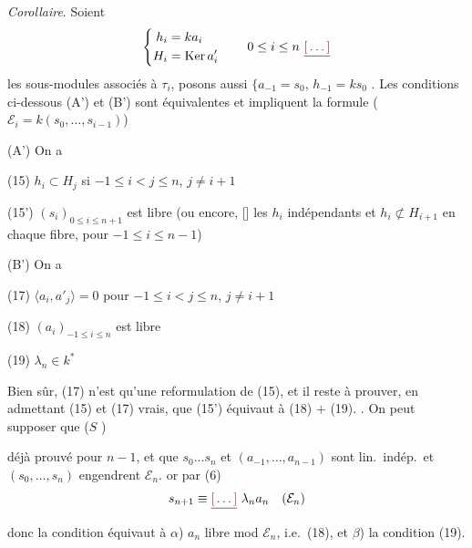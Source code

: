 \documentclass[11pt,a4paper]{article}
\begin{document}
\emph{Corollaire}. Soient
\[
\left\lbrace
\begin{aligned}
h_i &= k a_i \\
H_i &= \mathrm{Ker}\, a'_i
\end{aligned}
\right.
\qquad 0 \leq i \leq n \ \struck{\ill{}}
\]
les sous-modules associés à $\tau_i$, posons aussi $\lbrace a_{-1} = s_0$, $h_{-1} = k s_0$ \struck{\ill{}}.
Les conditions ci-dessous  (A') et (B') sont équivalentes et impliquent la formule  ($\mathcal{E}_i = k(s_0, \dots, s_{i-1})$)

(A') On a

\struck{\ill{}} (15) $h_i \subset H_j$ si $-1 \leq i < j \leq n$, $j \neq i+1$

(15') \struck{\ill{}} $(s_i)_{0 \leq i \leq n+1}$ est libre (ou encore, \struck{\ill{}} [\struck{\ill{}}] les $h_i$ indépendants \struck{\ill{}} et $h_i \not\subset H_{i+1}$ en chaque fibre, pour $-1 \leq i \leq n-1$)

(B') On a

(17) $\langle a_i, a'_j \rangle = 0$ pour $-1 \leq i < j \leq n$, $j \neq i+1$

(18) \struck{\ill{}} $(a_i)_{-1 \leq i \leq n}$ est libre

(19) $\lambda_n \in k^*$

Bien sûr, (17) n'est qu'une reformulation de (15), et il reste à prouver, en admettant (15) et (17) vrais, que (15') équivaut à (18) $+$ (19).  . On peut supposer que \struck{\ill{}} ($S$ ) \ill{}

déjà prouvé pour $n-1$, et que $s_0 \dots s_n$ et $(a_{-1}, \dots, a_{n-1})$ sont lin.\ indép.\ et $(s_0, \dots, s_n)$ engendrent $\mathcal{E}_n$.    or par (6)
\[
s_{n+1} \equiv \struck{\ill{}}\ \lambda_n a_n \quad (\mathcal{E}_n)
\]
donc la condition équivaut à $\alpha$) $a_n$ libre mod $\mathcal{E}_n$, i.e.\ (18), et $\beta$) \struck{\ill{}} la condition (19). \struck{\ill{}}
\end{document}
